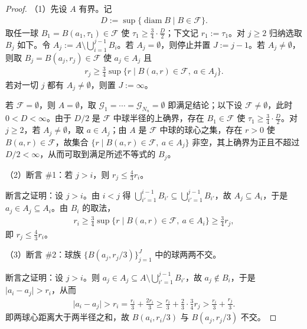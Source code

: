 \documentclass[../../main.tex]{subfiles}%
\begin{document}
\begin{proof}
（1）先设 $A$ 有界。记
\begin{align*}
D:=\sup\{\operatorname{diam}B\mid B\in\mathcal{F}\}.
\end{align*}
取任一球 $B_1=B(a_1,\tau_1)\in\mathcal{F}$ 使 $\tau_1\geqslant\frac{3}{4}\cdot\frac{D}{2}$；下文记 $r_1:=\tau_1$。对 $j\geqslant2$ 归纳选取 $B_j$ 如下。令 $A_j:=A\setminus\bigcup_{i=1}^{j-1}B_i$。若 $A_j=\emptyset$，则停止并置 $J:=j-1$。若 $A_j\neq\emptyset$，则取 $B_j=B(a_j,r_j)\in\mathcal{F}$ 使 $a_j\in A_j$ 且
\begin{align*}
r_j\geqslant\frac{3}{4}\sup\{r\mid B(a,r)\in\mathcal{F},\ a\in A_j\}.
\end{align*}
若对一切 $j$ 都有 $A_j\neq\emptyset$，则置 $J:=\infty$。

若 $\mathcal{F}=\emptyset$，则 $A=\emptyset$，取 $\mathcal{G}_1=\cdots=\mathcal{G}_{N_n}=\emptyset$ 即满足结论；以下设 $\mathcal{F}\neq\emptyset$，此时 $0<D<\infty$。由于 $D/2$ 是 $\mathcal{F}$ 中球半径的上确界，存在 $B_1\in\mathcal{F}$ 使 $\tau_1\geqslant\frac{3}{4}\cdot\frac{D}{2}$。对 $j\geqslant2$，若 $A_j\neq\emptyset$，取 $a\in A_j$；由 $A$ 是 $\mathcal{F}$ 中球的球心之集，存在 $r>0$ 使 $B(a,r)\in\mathcal{F}$，故集合 $\{r\mid B(a,r)\in\mathcal{F},\ a\in A_j\}$ 非空，其上确界为正且不超过 $D/2<\infty$，从而可取到满足所述不等式的 $B_j$。

（2）断言 \#1：若 $j>i$，则 $r_j\leqslant\frac{4}{3}r_i$。

断言之证明：设 $j>i$。由 $i<j$ 得 $\bigcup_{i'=1}^{i-1}B_{i'}\subseteq\bigcup_{i'=1}^{j-1}B_{i'}$，故 $A_j\subseteq A_i$，于是 $a_j\in A_j\subseteq A_i$。由 $B_i$ 的取法，
\begin{align*}
r_i\geqslant\frac{3}{4}\sup\{r\mid B(a,r)\in\mathcal{F},\ a\in A_i\}\geqslant\frac{3}{4}r_j,
\end{align*}
即 $r_j\leqslant\frac{4}{3}r_i$。

（3）断言 \#2：球族 $\{B(a_j,r_j/3)\}_{j=1}^{J}$ 中的球两两不交。

断言之证明：设 $j>i$。则 $a_j\in A_j\subseteq A\setminus\bigcup_{i'=1}^{j-1}B_{i'}$，故 $a_j\notin B_i$，于是 $\lvert a_i-a_j\rvert>r_i$，从而
\begin{align*}
\lvert a_i-a_j\rvert>r_i=\frac{r_i}{3}+\frac{2r_i}{3}\geqslant\frac{r_i}{3}+\frac{2}{3}\cdot\frac{3}{4}r_j>\frac{r_i}{3}+\frac{r_j}{3}.
\end{align*}
即两球心距离大于两半径之和，故 $B(a_i,r_i/3)$ 与 $B(a_j,r_j/3)$ 不交。


\end{proof}
\end{document}
